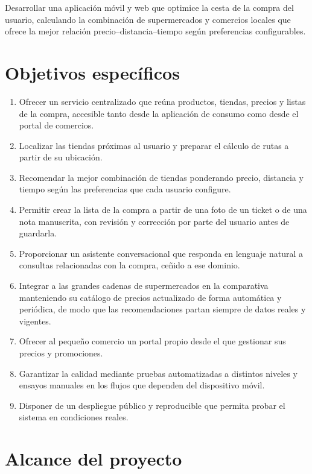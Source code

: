 Desarrollar una aplicaci\'on m\'ovil y web que optimice la cesta de la compra del usuario,
calculando la combinaci\'on de supermercados y comercios locales que ofrece la mejor relaci\'on
precio--distancia--tiempo seg\'un preferencias configurables.

\section{Objetivos espec\'ificos}

\begin{enumerate}
	\item Ofrecer un servicio centralizado que re\'una productos, tiendas, precios y listas de la
		compra, accesible tanto desde la aplicaci\'on de consumo como desde el portal de comercios.
	\item Localizar las tiendas pr\'oximas al usuario y preparar el c\'alculo de rutas a partir de
		su ubicaci\'on.
	\item Recomendar la mejor combinaci\'on de tiendas ponderando precio, distancia y tiempo seg\'un
		las preferencias que cada usuario configure.
	\item Permitir crear la lista de la compra a partir de una foto de un ticket o de una nota
		manuscrita, con revisi\'on y correcci\'on por parte del usuario antes de guardarla.
	\item Proporcionar un asistente conversacional que responda en lenguaje natural a consultas
		relacionadas con la compra, ce\~nido a ese dominio.
	\item Integrar a las grandes cadenas de supermercados en la comparativa manteniendo su
		cat\'alogo de precios actualizado de forma autom\'atica y peri\'odica, de modo que las
		recomendaciones partan siempre de datos reales y vigentes.
	\item Ofrecer al peque\~no comercio un portal propio desde el que gestionar sus precios y
		promociones.
	\item Garantizar la calidad mediante pruebas automatizadas a distintos niveles y ensayos
		manuales en los flujos que dependen del dispositivo m\'ovil.
	\item Disponer de un despliegue p\'ublico y reproducible que permita probar el sistema en
		condiciones reales.
\end{enumerate}

\section{Alcance del proyecto}

